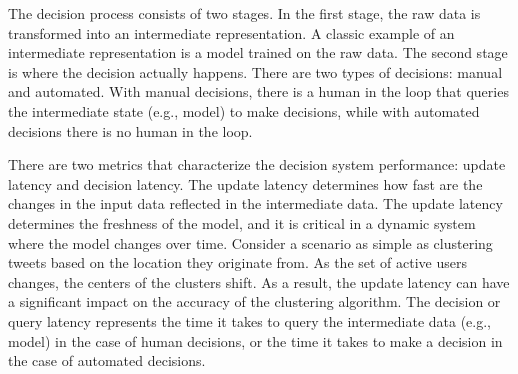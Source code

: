 The decision process consists of two stages. In the first stage, the raw data is transformed into an intermediate representation. A classic example of an intermediate representation is a model trained on the raw data. The second stage is where the decision actually happens. There are two types of decisions: manual and automated. With manual decisions, there is a human in the loop that queries the intermediate state (e.g., model) to make decisions, while with automated decisions there is no human in the loop.

There are two metrics that characterize the decision system performance: update latency and decision latency. The update latency determines how fast are the changes in the input data reflected in the intermediate data. The update latency determines the freshness of the model, and it is critical in a dynamic system where the model changes over time. Consider a scenario as simple as clustering tweets based on the location they originate from. As the set of active users changes, the centers of the clusters shift. As a result, the update latency can have a significant impact on the accuracy of the clustering algorithm. The decision or query latency represents the time it takes to query the intermediate data (e.g., model) in the case of human decisions, or the time it takes to make a decision in the case of automated decisions.
